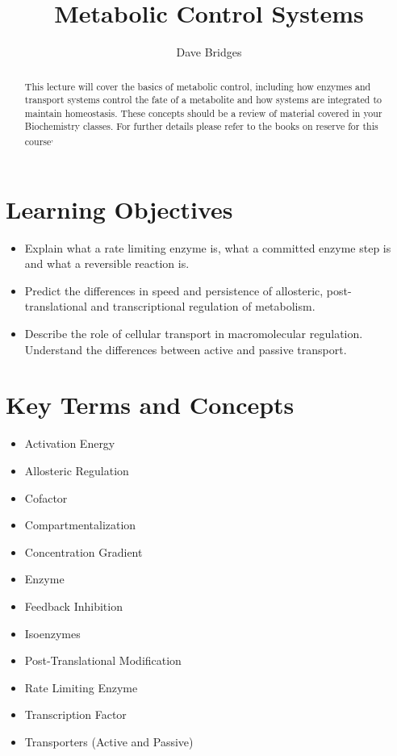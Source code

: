 \documentclass{tufte-handout}
\title{Metabolic Control Systems}
\author{Dave Bridges}
\begin{document}
\maketitle%

\begin{abstract}
\noindent This lecture will cover the basics of metabolic control, including how enzymes and transport systems control the fate of a metabolite and how systems are integrated to maintain homeostasis.  These concepts should be a review of material covered in your Biochemistry classes.  For further details please refer to the books on reserve for this course\cite{Berg2013}\textsuperscript{,}\cite{Ferrier2017}
\end{abstract}

\tableofcontents

\pagebreak{}
\section{Learning Objectives}

\begin{itemize}
\item Explain what a rate limiting enzyme is, what a committed enzyme step is and what a reversible reaction is.
\item Predict the differences in speed and persistence of allosteric, post-translational and transcriptional regulation of metabolism.
\item Describe the role of cellular transport in macromolecular regulation. Understand the differences between active and passive transport.

\end{itemize}

\section{Key Terms and Concepts}

\begin{itemize}
\item Activation Energy
\item Allosteric Regulation
\item Cofactor
\item Compartmentalization
\item Concentration Gradient
\item Enzyme
\item Feedback Inhibition
\item Isoenzymes
\item Post-Translational Modification
\item Rate Limiting Enzyme
\item Transcription Factor
\item Transporters (Active and Passive)
\end{itemize}
\end{document}

